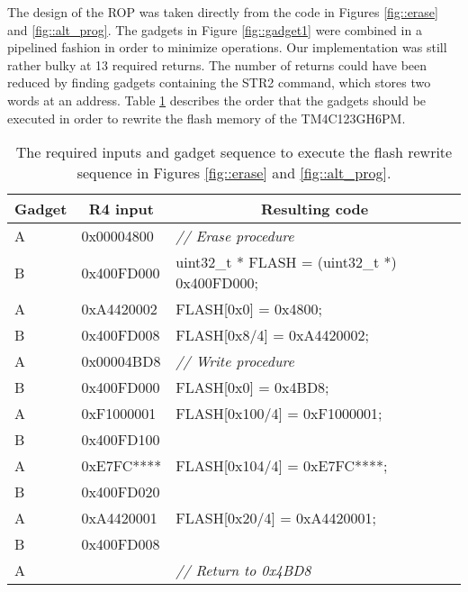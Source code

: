 The design of the ROP was taken directly from the code in Figures \ref{fig::erase} and \ref{fig::alt_prog}. The gadgets in Figure \ref{fig::gadget1} were combined in a pipelined fashion in order to minimize operations. Our implementation was still rather bulky at 13 required returns. The number of returns could have been reduced by finding gadgets containing the STR2 command, which stores two words at an address. Table \ref{tab:gadgets} describes the order that the gadgets should be executed in order to rewrite the flash memory of the TM4C123GH6PM.

\begin{table}[htbp]
  \centering
  \caption{The required inputs and gadget sequence to execute the flash rewrite sequence in Figures \ref{fig::erase} and \ref{fig::alt_prog}. }
    \begin{tabular}{rrr}
    \toprule
    \multicolumn{1}{c}{Gadget} & \multicolumn{1}{c}{R4 input} & \multicolumn{1}{c}{Resulting code} \\
    \midrule
    \multicolumn{1}{l}{A} & \multicolumn{1}{l}{0x00004800} & \multicolumn{1}{l}{\textit{// Erase procedure}} \\
    \multicolumn{1}{l}{B} & \multicolumn{1}{l}{0x400FD000} & \multicolumn{1}{l}{uint32\_t * FLASH = (uint32\_t *) 0x400FD000;} \\
    \multicolumn{1}{l}{A} & \multicolumn{1}{l}{0xA4420002} & \multicolumn{1}{l}{FLASH[0x0] = 0x4800;} \\
    \multicolumn{1}{l}{B} & \multicolumn{1}{l}{0x400FD008} & \multicolumn{1}{l}{FLASH[0x8/4] = 0xA4420002;} \\
    \multicolumn{1}{l}{A} & \multicolumn{1}{l}{0x00004BD8} & \multicolumn{1}{l}{\textit{// Write procedure}} \\
    \multicolumn{1}{l}{B} & \multicolumn{1}{l}{0x400FD000} & \multicolumn{1}{l}{FLASH[0x0] = 0x4BD8;} \\
    \multicolumn{1}{l}{A} & \multicolumn{1}{l}{0xF1000001} & \multicolumn{1}{l}{FLASH[0x100/4] = 0xF1000001;} \\
    \multicolumn{1}{l}{B} & \multicolumn{1}{l}{0x400FD100} & \multicolumn{1}{l}{} \\
    \multicolumn{1}{l}{A} & \multicolumn{1}{l}{0xE7FC****} & \multicolumn{1}{l}{FLASH[0x104/4] = 0xE7FC****;} \\
    \multicolumn{1}{l}{B} & \multicolumn{1}{l}{0x400FD020} & \multicolumn{1}{l}{} \\
    \multicolumn{1}{l}{A} & \multicolumn{1}{l}{0xA4420001} & \multicolumn{1}{l}{FLASH[0x20/4] = 0xA4420001;} \\
    \multicolumn{1}{l}{B} & \multicolumn{1}{l}{0x400FD008} & \multicolumn{1}{l}{} \\
    \multicolumn{1}{l}{A} & \multicolumn{1}{l}{} & \multicolumn{1}{l}{\textit{// Return to 0x4BD8}} \\

    \bottomrule
    \end{tabular}%
  \label{tab:gadgets}%
\end{table}%

